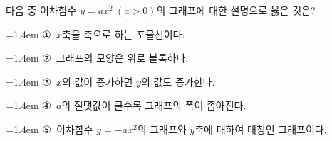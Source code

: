 다음 중 이차함수 $y=ax^2\ (a>0)$의 그래프에 대한 설명으로 옳은 것은?
\par\medskip\par\noindent\hangindent=1.4em {\small ①}\ $x$축을 축으로 하는 포물선이다.\par\noindent\hangindent=1.4em {\small ②}\ 그래프의 모양은 위로 볼록하다.\par\noindent\hangindent=1.4em {\small ③}\ $x$의 값이 증가하면 $y$의 값도 증가한다.\par\noindent\hangindent=1.4em {\small ④}\ $a$의 절댓값이 클수록 그래프의 폭이 좁아진다.\par\noindent\hangindent=1.4em {\small ⑤}\ 이차함수 $y=-ax^2$의 그래프와 $y$축에 대하여 대칭인 그래프이다.\par\medskip

